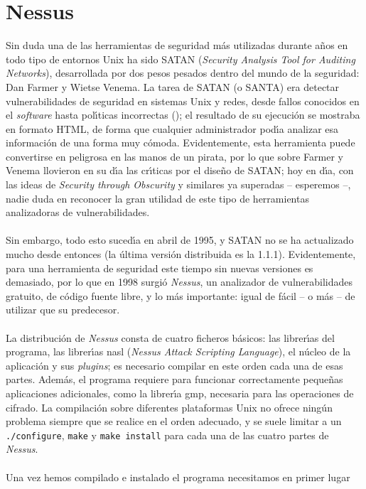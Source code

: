 \section{Nessus}
Sin duda una de las herramientas de seguridad m\'as utilizadas durante a\~nos
en todo tipo de entornos Unix ha sido SATAN ({\it Security Analysis Tool for 
Auditing Networks}), desarrollada por dos pesos pesados dentro del mundo de la
seguridad: Dan Farmer y Wietse Venema. La tarea de SATAN (o SANTA) era detectar
vulnerabilidades de seguridad en sistemas Unix y redes, desde fallos conocidos
en el {\it software} hasta pol\'{\i}ticas incorrectas (\cite{kn:fre98}); el 
resultado de su 
ejecuci\'on se mostraba en formato HTML, de forma que cualquier administrador
pod\'{\i}a analizar esa informaci\'on de una forma muy c\'omoda. Evidentemente,
esta herramienta puede convertirse en peligrosa en las manos de un pirata, por
lo que sobre Farmer y Venema llovieron en su d\'{\i}a las cr\'{\i}ticas por
el dise\~no de SATAN; hoy en d\'{\i}a, con las ideas de {\it Security through
Obscurity} y similares ya superadas -- esperemos --, nadie duda en reconocer la 
gran utilidad de este tipo de herramientas analizadoras de vulnerabilidades.\\
\\Sin embargo, todo esto suced\'{\i}a en abril de 1995, y SATAN no se ha
actualizado mucho desde entonces (la \'ultima versi\'on distribuida es la 
1.1.1). Evidentemente, para una herramienta de seguridad este tiempo sin nuevas
versiones es demasiado, por lo que en 1998 surgi\'o {\it Nessus}, un analizador
de vulnerabilidades gratuito, de c\'odigo fuente libre, y lo m\'as importante:
igual de f\'acil -- o m\'as -- de utilizar que su predecesor.\\
\\La distribuci\'on de {\it Nessus} consta de cuatro ficheros b\'asicos: las
librer\'{\i}as del programa, las librer\'{\i}as {\sc nasl} ({\it Nessus Attack 
Scripting Language}), el n\'ucleo de la aplicaci\'on y sus {\it plugins}; es 
necesario compilar en este orden cada una
de esas partes. Adem\'as, el programa requiere para funcionar correctamente
peque\~nas aplicaciones adicionales, como la librer\'{\i}a {\sc gmp}, necesaria
para las operaciones de cifrado. La compilaci\'on sobre diferentes plataformas
Unix no ofrece ning\'un problema siempre que se realice en el orden adecuado,
y se suele limitar a un {\tt ./configure}, {\tt make} y {\tt make install} para
cada una de las cuatro partes de {\it Nessus}.\\
\\Una vez hemos compilado e instalado el programa necesitamos en primer lugar
